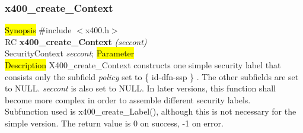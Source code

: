\subsubsection{x400\_create\_Context}
\label{x4_cr_Scon}
\hl{Synopsis}
\#include $<$x400.h$>$ \\ [1ex]
RC {\bf x400\_create\_Context} {\em (seccont)} \\
SecurityContext {\em *seccont};
\hl{Parameter}
 \\[1ex]
\hl{Description}
X400\_create\_Context
constructs one simple security label that consists only
the subfield {\em policy} set to \{ id-dfn-ssp \} .
The other subfields are set to NULL.
{\em seccont} is also set to NULL.
In later versions, this function shall become more complex
in order to assemble different security labels.
\\
Subfunction used is x400\_create\_Label(),
although this is not necessary for the simple version.
The return value is 0 on success, -1 on error.

